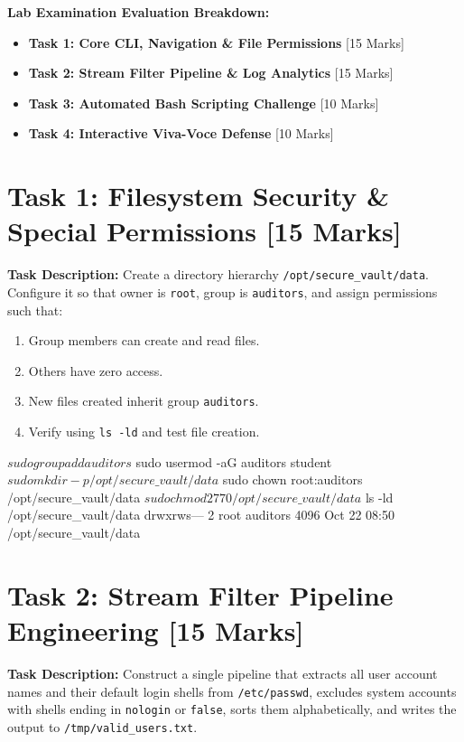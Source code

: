 
\begin{markingrubric}
\textbf{Lab Examination Evaluation Breakdown:}
\begin{itemize}[leftmargin=1.5em, itemsep=1pt]
    \item \textbf{Task 1: Core CLI, Navigation \& File Permissions} \hfill [15 Marks]
    \item \textbf{Task 2: Stream Filter Pipeline \& Log Analytics} \hfill [15 Marks]
    \item \textbf{Task 3: Automated Bash Scripting Challenge} \hfill [10 Marks]
    \item \textbf{Task 4: Interactive Viva-Voce Defense} \hfill [10 Marks]
\end{itemize}
\end{markingrubric}

\section*{Task 1: Filesystem Security \& Special Permissions [15 Marks]}
\textbf{Task Description:} Create a directory hierarchy \texttt{/opt/secure\_vault/data}. Configure it so that owner is \texttt{root}, group is \texttt{auditors}, and assign permissions such that:
\begin{enumerate}[label=(\alph*)]
    \item Group members can create and read files.
    \item Others have zero access.
    \item New files created inherit group \texttt{auditors}.
    \item Verify using \texttt{ls -ld} and test file creation.
\end{enumerate}

\begin{examcli}
$ sudo groupadd auditors
$ sudo usermod -aG auditors student
$ sudo mkdir -p /opt/secure\_vault/data
$ sudo chown root:auditors /opt/secure\_vault/data
$ sudo chmod 2770 /opt/secure\_vault/data
$ ls -ld /opt/secure\_vault/data
drwxrws--- 2 root auditors 4096 Oct 22 08:50 /opt/secure\_vault/data
\end{examcli}

\section*{Task 2: Stream Filter Pipeline Engineering [15 Marks]}
\textbf{Task Description:} Construct a single pipeline that extracts all user account names and their default login shells from \texttt{/etc/passwd}, excludes system accounts with shells ending in \texttt{nologin} or \texttt{false}, sorts them alphabetically, and writes the output to \texttt{/tmp/valid\_users.txt}.

